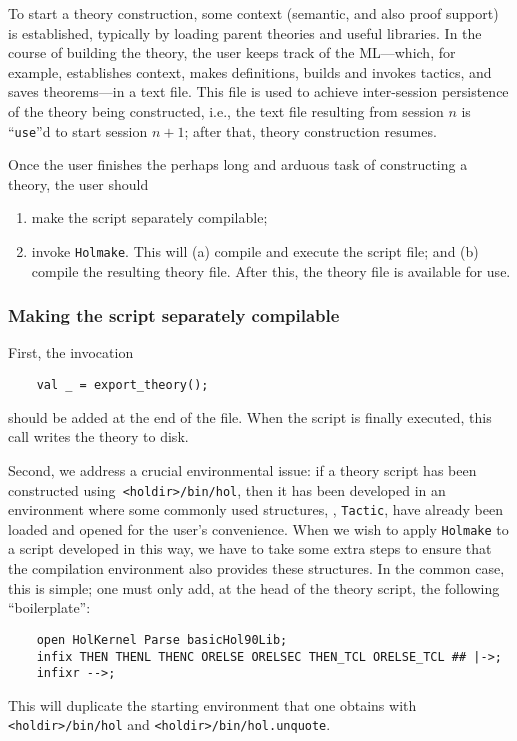 To start a theory construction, some context (semantic, and also proof
support) is established, typically by loading parent theories and
useful libraries. In the course of building the theory, the user keeps
track of the ML---which, for example, establishes context, makes
definitions, builds and invokes tactics, and saves theorems---in a
text file. This file is used to achieve inter-session persistence of
the theory being constructed, i.e., the text file resulting from
session $n$ is ``\verb+use+''d to start session $n+1$; after that,
theory construction resumes.

Once the user finishes the perhaps long and arduous task of constructing
a theory, the user should
\begin{enumerate}
\item make the script separately compilable;
\item invoke {\tt Holmake}. This will (a) compile and execute the
  script file; and (b) compile the resulting theory file. After this,
  the theory file is available for use.
\end{enumerate}

\subsubsection{Making the script separately compilable}

First, the invocation
\begin{verbatim}
    val _ = export_theory();
\end{verbatim}
should be added at the end of the file. When the script is finally
executed, this call writes the theory to disk.

Second, we address a crucial environmental issue: if a theory script
has been constructed using\verb+ <holdir>/bin/hol+, then it has been
developed in an environment where some commonly used structures, \eg,
\verb+Tactic+, have already been loaded and opened for the user's
convenience. When we wish to apply {\tt Holmake} to a script developed
in this way, we have to take some extra steps to ensure that the
compilation environment also provides these structures.  In the common
case, this is simple; one must only add, at the head of the theory
script, the following ``boilerplate'':
\begin{verbatim}
    open HolKernel Parse basicHol90Lib;
    infix THEN THENL THENC ORELSE ORELSEC THEN_TCL ORELSE_TCL ## |->;
    infixr -->;
\end{verbatim}
This will duplicate the starting environment that one obtains with
\verb+<holdir>/bin/hol+ and \verb+<holdir>/bin/hol.unquote+.

